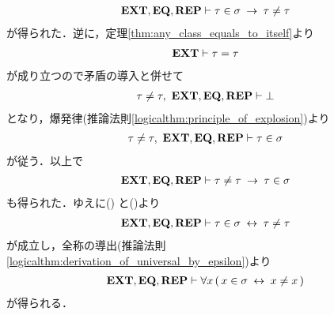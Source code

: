 \begin{sketch}
\begin{align}
			\mbox{{\bf EXT}},\mbox{{\bf EQ}},\mbox{{\bf REP}} \vdash \tau \in \sigma \hspace{0.25em}\rightarrow\hspace{0.25em} \tau \neq \tau
			\label{fom:thm_emptyset_is_a_set_3}
		\end{align}
		が得られた．逆に，定理\ref{thm:any_class_equals_to_itself}より
		\begin{align}
			\mbox{{\bf EXT}} \vdash \tau = \tau 
		\end{align}
		が成り立つので矛盾の導入と併せて
		\begin{align}
			\tau \neq \tau,\ \mbox{{\bf EXT}},\mbox{{\bf EQ}},\mbox{{\bf REP}} \vdash \bot
		\end{align}
		となり，爆発律(推論法則\ref{logicalthm:principle_of_explosion})より
		\begin{align}
			\tau \neq \tau,\ \mbox{{\bf EXT}},\mbox{{\bf EQ}},\mbox{{\bf REP}} \vdash \tau \in \sigma
		\end{align}
		が従う．以上で
		\begin{align}
			\mbox{{\bf EXT}},\mbox{{\bf EQ}},\mbox{{\bf REP}} \vdash \tau \neq \tau \hspace{0.25em}\rightarrow\hspace{0.25em} \tau \in \sigma
			\label{fom:thm_emptyset_is_a_set_4}
		\end{align}
		も得られた．ゆえに()
		と()より
		\begin{align}
			\mbox{{\bf EXT}},\mbox{{\bf EQ}},\mbox{{\bf REP}} \vdash \tau \in \sigma \hspace{0.25em}\leftrightarrow\hspace{0.25em} \tau \neq \tau
		\end{align}
		が成立し，全称の導出(推論法則\ref{logicalthm:derivation_of_universal_by_epsilon})より
		\begin{align}
			\mbox{{\bf EXT}},\mbox{{\bf EQ}},\mbox{{\bf REP}} \vdash 
			\forall x\, (\, x \in \sigma \hspace{0.25em}\leftrightarrow\hspace{0.25em} x \neq x\, )
			\label{fom:thm_emptyset_is_a_set_6}
		\end{align}
		が得られる．
		

\end{sketch}
